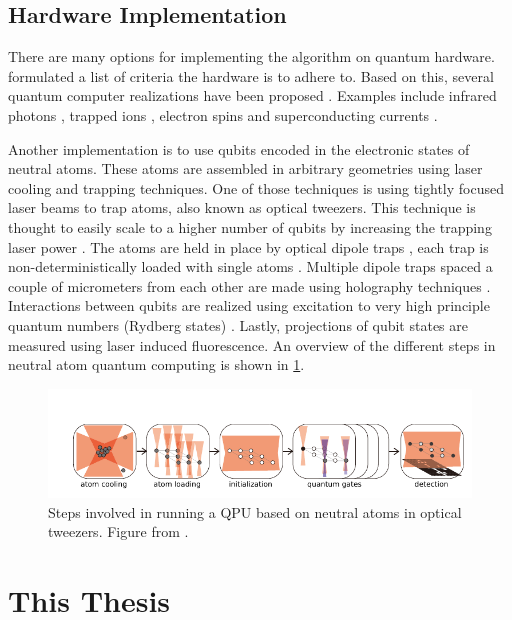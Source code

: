 \subsection{Hardware Implementation}

There are many options for implementing the algorithm on quantum hardware. 
\cite{DiVincenzo2000} formulated a list of criteria the hardware is to adhere to. 
Based on this, several quantum computer realizations have been proposed \cite{Ladd2010}.
Examples include infrared photons \cite{Matthews2009}, trapped ions \cite{Benhelm2008,Schindler2013}, electron spins \cite{Press2008} and superconducting currents \cite{DiCarlo2009,Arute2019}. 

Another implementation is to use qubits encoded in the electronic states of neutral atoms. 
These atoms are assembled in arbitrary geometries using laser cooling and trapping techniques. 
One of those techniques is using tightly focused laser beams to trap atoms, also known as optical tweezers.
This technique is thought to easily scale to a higher number of qubits by increasing the trapping laser power \cite{Henriet2020}.
The atoms are held in place by optical dipole traps \cite{Chu1986}, each trap is non-deterministically loaded with single atoms \cite{Schlosser2001}. 
Multiple dipole traps spaced a couple of micrometers from each other are made using holography techniques \cite{Bergamini2004}.
Interactions between qubits are realized using excitation to very high principle quantum numbers (Rydberg states) \cite{Levine2018,Madjarov2020}. 
Lastly, projections of qubit states are measured using laser induced fluorescence. 
An overview of the different steps in neutral atom quantum computing is shown in \cref{fig:ComputingSteps}.

\begin{figure}
	\centering
	\includegraphics[width=\linewidth]{figures/ComputingSteps.pdf}
	\caption{Steps involved in running a \ac{QPU} based on neutral atoms in optical tweezers. 
	Figure from \cite{Wu2021}.}
	\label{fig:ComputingSteps}
\end{figure}

\section{This Thesis}

